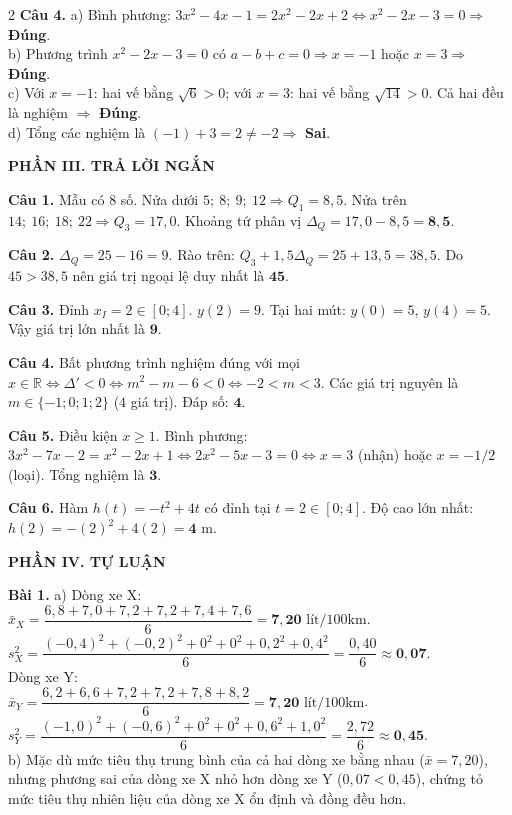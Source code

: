 \documentclass[10pt,a4paper]{article}
\begin{document}
\begin{multicols}{2}
\textbf{Câu 4.}
a) Bình phương: $3x^2 - 4x - 1 = 2x^2 - 2x + 2 \Leftrightarrow x^2 - 2x - 3 = 0 \Rightarrow$ \textbf{Đúng}.\\
b) Phương trình $x^2 - 2x - 3 = 0$ có $a - b + c = 0 \Rightarrow x = -1$ hoặc $x = 3 \Rightarrow$ \textbf{Đúng}.\\
c) Với $x = -1$: hai vế bằng $\sqrt{6} > 0$; với $x = 3$: hai vế bằng $\sqrt{14} > 0$. Cả hai đều là nghiệm $\Rightarrow$ \textbf{Đúng}.\\
d) Tổng các nghiệm là $(-1) + 3 = 2 \ne -2 \Rightarrow$ \textbf{Sai}.

\textbf{\color{accent}PHẦN III. TRẢ LỜI NGẮN}

\textbf{Câu 1.} Mẫu có $8$ số. Nửa dưới $5;\ 8;\ 9;\ 12 \Rightarrow Q_1 = 8{,}5$. Nửa trên $14;\ 16;\ 18;\ 22 \Rightarrow Q_3 = 17{,}0$. Khoảng tứ phân vị $\Delta_Q = 17{,}0 - 8{,}5 = \mathbf{8{,}5}$.

\textbf{Câu 2.} $\Delta_Q = 25 - 16 = 9$. Rào trên: $Q_3 + 1{,}5\Delta_Q = 25 + 13{,}5 = 38{,}5$. Do $45 > 38{,}5$ nên giá trị ngoại lệ duy nhất là $\mathbf{45}$.

\textbf{Câu 3.} Đỉnh $x_I = 2 \in [0; 4]$. $y(2) = 9$. Tại hai mút: $y(0) = 5$, $y(4) = 5$. Vậy giá trị lớn nhất là $\mathbf{9}$.

\textbf{Câu 4.} Bất phương trình nghiệm đúng với mọi $x \in \mathbb{R} \Leftrightarrow \Delta' < 0 \Leftrightarrow m^2 - m - 6 < 0 \Leftrightarrow -2 < m < 3$. Các giá trị nguyên là $m \in \{-1; 0; 1; 2\}$ ($4$ giá trị). Đáp số: $\mathbf{4}$.

\textbf{Câu 5.} Điều kiện $x \ge 1$. Bình phương: $3x^2 - 7x - 2 = x^2 - 2x + 1 \Leftrightarrow 2x^2 - 5x - 3 = 0 \Leftrightarrow x = 3$ (nhận) hoặc $x = -1/2$ (loại). Tổng nghiệm là $\mathbf{3}$.

\textbf{Câu 6.} Hàm $h(t) = -t^2 + 4t$ có đỉnh tại $t = 2 \in [0; 4]$. Độ cao lớn nhất: $h(2) = -(2)^2 + 4(2) = \mathbf{4}\text{ m}$.

\textbf{\color{accent}PHẦN IV. TỰ LUẬN}

\textbf{Bài 1.}
a) Dòng xe X:\\
$\bar{x}_X = \dfrac{6{,}8 + 7{,}0 + 7{,}2 + 7{,}2 + 7{,}4 + 7{,}6}{6} = \mathbf{7{,}20}\text{ lít/100km}$.\\
$s_X^2 = \dfrac{(-0{,}4)^2 + (-0{,}2)^2 + 0^2 + 0^2 + 0{,}2^2 + 0{,}4^2}{6} = \dfrac{0{,}40}{6} \approx \mathbf{0{,}07}$.\\
Dòng xe Y:\\
$\bar{x}_Y = \dfrac{6{,}2 + 6{,}6 + 7{,}2 + 7{,}2 + 7{,}8 + 8{,}2}{6} = \mathbf{7{,}20}\text{ lít/100km}$.\\
$s_Y^2 = \dfrac{(-1{,}0)^2 + (-0{,}6)^2 + 0^2 + 0^2 + 0{,}6^2 + 1{,}0^2}{6} = \dfrac{2{,}72}{6} \approx \mathbf{0{,}45}$.\\
b) Mặc dù mức tiêu thụ trung bình của cả hai dòng xe bằng nhau ($\bar{x} = 7{,}20$), nhưng phương sai của dòng xe X nhỏ hơn dòng xe Y ($0{,}07 < 0{,}45$), chứng tỏ mức tiêu thụ nhiên liệu của dòng xe X ổn định và đồng đều hơn.


\end{multicols}
\end{document}
